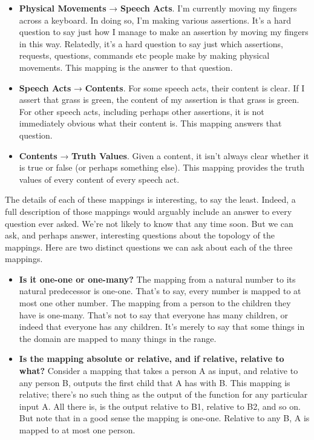 \documentclass[
  11pt,
  letterpaper,
  DIV=11,
  numbers=noendperiod,
  twoside]{scrartcl}
\begin{document}
\begin{itemize}
\item
  \textbf{Physical Movements} → \textbf{Speech Acts}. I'm currently
  moving my fingers across a keyboard. In doing so, I'm making various
  assertions. It's a hard question to say just how I manage to make an
  assertion by moving my fingers in this way. Relatedly, it's a hard
  question to say just which assertions, requests, questions, commands
  etc people make by making physical movements. This mapping is the
  answer to that question.
\item
  \textbf{Speech Acts} → \textbf{Contents}. For some speech acts, their
  content is clear. If I assert that grass is green, the content of my
  assertion is that grass is green. For other speech acts, including
  perhaps other assertions, it is not immediately obvious what their
  content is. This mapping answers that question.
\item
  \textbf{Contents} → \textbf{Truth Values}. Given a content, it isn't
  always clear whether it is true or false (or perhaps something else).
  This mapping provides the truth values of every content of every
  speech act.
\end{itemize}

The details of each of these mappings is interesting, to say the least.
Indeed, a full description of those mappings would arguably include an
answer to every question ever asked. We're not likely to know that any
time soon. But we can ask, and perhaps answer, interesting questions
about the topology of the mappings. Here are two distinct questions we
can ask about each of the three mappings.

\begin{itemize}
\item
  \textbf{Is it one-one or one-many?} The mapping from a natural number
  to its natural predecessor is one-one. That's to say, every number is
  mapped to at most one other number. The mapping from a person to the
  children they have is one-many. That's not to say that everyone has
  many children, or indeed that everyone has any children. It's merely
  to say that some things in the domain are mapped to many things in the
  range.
\item
  \textbf{Is the mapping absolute or relative, and if relative, relative
  to what?} Consider a mapping that takes a person A as input, and
  relative to any person B, outputs the first child that A has with B.
  This mapping is relative; there's no such thing as the output of the
  function for any particular input A. All there is, is the output
  relative to B1, relative to B2, and so on. But note that in a good
  sense the mapping is one-one. Relative to any B, A is mapped to at
  most one person.
\end{itemize}
\end{document}
